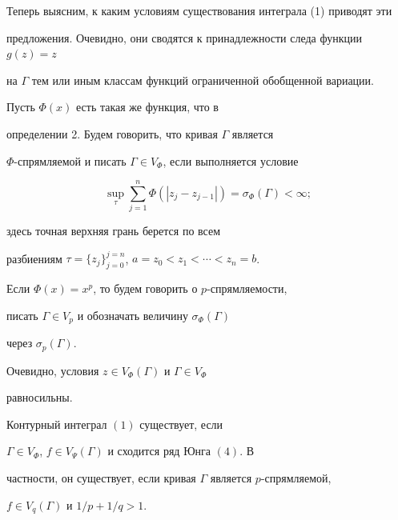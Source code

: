 Теперь выясним, к каким условиям существования интеграла (1) приводят эти


предложения. Очевидно, они сводятся к принадлежности следа функции $g(z)=z$


на $\Gamma$ тем или иным классам функций ограниченной обобщенной вариации.





\begin{defn} Пусть $\Phi (x)$ есть такая же функция, что в


определении 2. Будем говорить, что кривая $\Gamma$ является


$\Phi$-спрямляемой и писать $\Gamma\in V_{\Phi}$, если выполняется условие


$$


\sup_{\tau}\sum_{j=1}^{n}\Phi(| z_{j} - z_{j-1}|) =


\sigma_{\Phi}(\Gamma)<\infty;


$$


здесь точная верхняя грань берется по всем


разбиениям $\tau = \{z_{j}\}_{j=0}^{j=n}$, $a=z_{0}<z_{1}<\dotsb<z_{n}=b$.


Если $\Phi (x) = x^p$, то будем говорить о $p$-спрямляемости,


писать $\Gamma\in V_{p}$ и обозначать величину $\sigma_{\Phi}(\Gamma)$


через $\sigma_{p}(\Gamma)$.


\end{defn}





Очевидно, условия $z\in V_{\Phi}(\Gamma)$ и $\Gamma\in V_{\Phi}$


равносильны.





\begin{thm}


Контурный интеграл $(1)$ существует, если


$\Gamma\in V_{\Phi}$, $f\in V_{\Psi}(\Gamma)$ и сходится ряд Юнга $(4)$. В


частности, он существует, если кривая $\Gamma$ является $p$-спрямляемой,


$f\in V_{q}(\Gamma)$ и $1/p+1/q>1.$


\end{thm}





